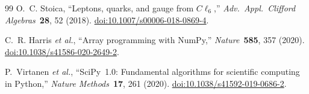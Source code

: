 \documentclass[12pt]{article}
\theoremstyle{definition}
\theoremstyle{remark}
\begin{document}
\begin{thebibliography}{99}
		O.~C. Stoica,
		``Leptons, quarks, and gauge from $C\ell_6$,''
		\textit{Adv.\ Appl.\ Clifford Algebras}~\textbf{28}, 52 (2018).
		\href{https://doi.org/10.1007/s00006-018-0869-4}{doi:10.1007/s00006-018-0869-4}.
		
		C.~R. Harris \textit{et al.},
		``Array programming with {NumPy},''
		\textit{Nature}~\textbf{585}, 357 (2020).
		\href{https://doi.org/10.1038/s41586-020-2649-2}{doi:10.1038/s41586-020-2649-2}.
		
		P.~Virtanen \textit{et al.},
		``{SciPy}~1.0: Fundamental algorithms for scientific computing in {Python},''
		\textit{Nature Methods}~\textbf{17}, 261 (2020).
		\href{https://doi.org/10.1038/s41592-019-0686-2}{doi:10.1038/s41592-019-0686-2}.
		
	\end{thebibliography}
	
\end{document}
